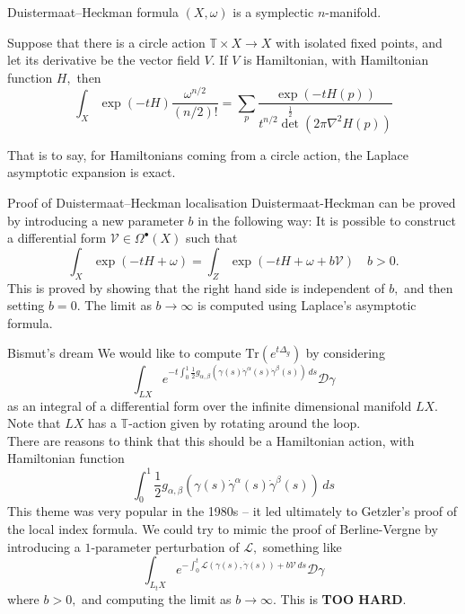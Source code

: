 \documentclass{beamer}
\numberwithin{equation}{section}
\theoremstyle{plain}
\theoremstyle{plain}
\theoremstyle{definition}
\theoremstyle{plain}
\theoremstyle{plain}
\theoremstyle{definition}
\newcommand{\Circ}{\mathbb{T}}
\newcommand{\Dc}{\mathcal{D}}
\newcommand{\Lc}{\mathcal{L}}
\newcommand{\Vc}{\mathcal{V}}
\newcommand{\Tr}{\mathrm{Tr}}
\begin{document}
\begin{frame}{Duistermaat--Heckman formula}
  $(X,\omega)$ is a symplectic $n$-manifold.
  \begin{theorem}
      Suppose that there is a circle action $\Circ\times X\to X$ with isolated fixed points, and let its derivative be the vector field $V.$ If $V$ is Hamiltonian, with Hamiltonian function $H,$ then
      \[
          \int_X \exp(-tH) \frac{\omega^{n/2}}{(n/2)!} = \sum_{p} \frac{\exp(-tH(p))}{t^{n/2}\det^{\frac12}(2\pi \nabla^2 H(p))}
      \]
  \end{theorem}
  \pause
  That is to say, for Hamiltonians coming from a circle action, the Laplace asymptotic expansion is exact.
\end{frame}

\begin{frame}{Proof of Duistermaat--Heckman localisation}
    Duistermaat-Heckman can be proved by introducing a new parameter $b$ in the following way: It is possible to construct a differential form $\Vc \in \Omega^{\bullet}(X)$ such that
    \[
      \int_X \exp(-tH+\omega) = \int_Z \exp(-tH+\omega+b\Vc)\quad b>0.
    \]
    This is proved by showing that the right hand side is independent of $b,$ and then setting $b=0.$ The limit as $b\to\infty$ is computed using Laplace's asymptotic formula.
\end{frame}

\begin{frame}{Bismut's dream}
  We would like to compute $\Tr(e^{t\Delta_g})$ by considering
  \[
    \int_{LX} e^{-t\int_0^1 \frac12 g_{\alpha,\beta}(\gamma(s)\dot{\gamma}^{\alpha}(s)\dot{\gamma}^\beta(s))\,ds} \Dc\gamma
  \]
  as an integral of a differential form over the infinite dimensional manifold $LX.$
  Note that $LX$ has a $\Circ$-action given by rotating around the loop.
  \\
  There are reasons to think that this should be a Hamiltonian action, with Hamiltonian function
  \[
  \int_0^1 \frac12 g_{\alpha,\beta}(\gamma(s)\dot{\gamma}^{\alpha}(s)\dot{\gamma}^\beta(s))\,ds
  \]
  \pause
  This theme was very popular in the 1980s -- it led ultimately to Getzler's proof of the local index formula.  
  \pause
  We could try to mimic the proof of Berline-Vergne by introducing a $1$-parameter perturbation of $\Lc,$ something like
  \[
      \int_{L_tX} e^{-\int_0^t \Lc(\gamma(s),\dot{\gamma}(s))+b\Vc\,ds} \Dc\gamma
  \]
  where $b>0,$ and computing the limit as $b\to\infty.$
  \pause
  This is \textbf{TOO HARD}.
\end{frame}
\end{document}
